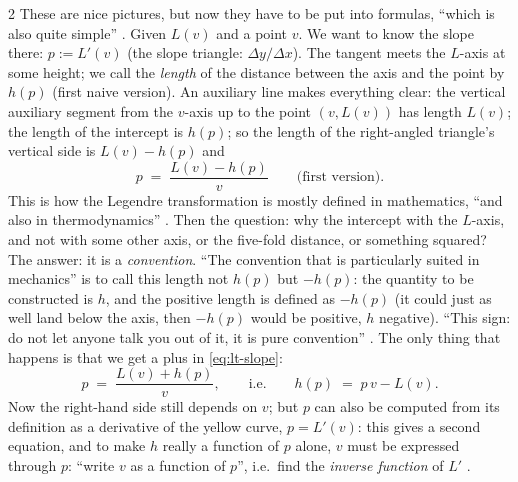 \begin{paracol}{2}
These are nice pictures, but now they have to be put into formulas, ``which is also quite simple'' . Given $L(v)$ and a point $v$. We want to know the slope there: $p:=L'(v)$ (the slope triangle: $\Delta y/\Delta x$). The tangent meets the $L$-axis at some height; we call the \emph{length} of the distance between the axis and the point by $h(p)$ (first naive version). An auxiliary line makes everything clear: the vertical auxiliary segment from the $v$-axis up to the point $(v,L(v))$ has length $L(v)$; the length of the intercept is $h(p)$; so the length of the right-angled triangle's vertical side is $L(v)-h(p)$ and
\begin{equation}\label{eq:lt-slope}
  p\;=\;\frac{L(v)-h(p)}{v}\qquad\text{(first version)}.
\end{equation}
This is how the Legendre transformation is mostly defined in mathematics, ``and also in thermodynamics'' . Then the question: why the intercept with the $L$-axis, and not with some other axis, or the five-fold distance, or something squared? The answer: it is a \emph{convention}. ``The convention that is particularly suited in mechanics'' is to call this length not $h(p)$ but $-h(p)$: the quantity to be constructed is $h$, and the positive length is defined as $-h(p)$ (it could just as well land below the axis, then $-h(p)$ would be positive, $h$ negative). ``This sign: do not let anyone talk you out of it, it is pure convention'' . The only thing that happens is that we get a plus in \eqref{eq:lt-slope}:
\[
  p\;=\;\frac{L(v)+h(p)}{v},\qquad\text{i.e.}\qquad h(p)\;=\;p\,v-L(v).
\]
Now the right-hand side still depends on $v$; but $p$ can also be computed from its definition as a derivative of the yellow curve, $p=L'(v)$: this gives a second equation, and to make $h$ really a function of $p$ alone, $v$ must be expressed through $p$: ``write $v$ as a function of $p$'', i.e.\ find the \emph{inverse function} of $L'$ .


\end{paracol}
